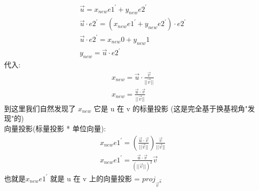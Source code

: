 \documentclass[12pt]{article}
\begin{document}
\begin{flushleft}
\begin{itemize}
              \begin{align}
                  \vec{u} =  x_{new}e1^{'} + y_{new}e2^{'}                             \\
                  \vec{u} \cdot e2^{'} =  (x_{new}e1^{'} + y_{new}e2^{'}) \cdot e2^{'} \\
                  \vec{u} \cdot e2^{'} =  x_{new}0 + y_{new}1                          \\
                  y_{new} = \vec{u} \cdot e2^{'}
              \end{align}
              代入: \\
              \begin{align}
                  x_{new} = \vec{u} \cdot \frac{\vec{v}}{||\vec{v}||} \\
                  x_{new} = \frac{\vec{u} \cdot  \vec{v}}{||\vec{v}||}
              \end{align}
              到这里我们自然发现了 $x_{new} $ 它是 u 在  v 的标量投影 (这是完全基于换基视角"发现"的) \\
              向量投影(标量投影 * 单位向量): \\
              \begin{align}
                  x_{new}e1^{'} = (\frac{\vec{u} \cdot  \vec{v}}{||\vec{v}||})\frac{\vec{v}}{||\vec{v}||} \\
                  x_{new}e1^{'} = \frac{\vec{u} \cdot  \vec{v}}{(||\vec{v}||)^{2}}\vec{v}
              \end{align}
              也就是$x_{new}e1^{'}$ 就是 u 在 v 上的向量投影 = $proj_{\vec{v}^{\vec{u}}}$ \\


\end{itemize}
\end{flushleft}
\end{document}
